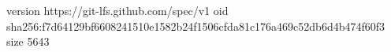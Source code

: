 version https://git-lfs.github.com/spec/v1
oid sha256:f7d64129bf6608241510e1582b24f1506cfda81c176a469c52db6d4b474f60f3
size 5643
